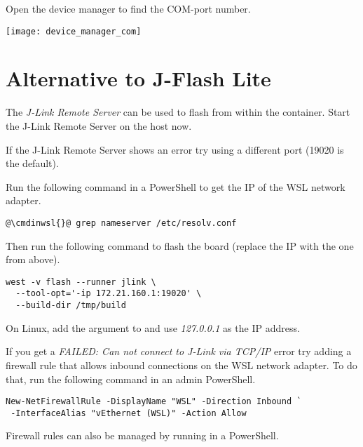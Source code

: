 \begin{infobox}
  Open the device manager to find the COM-port number.
  \begin{center}
    \texttt{[image: device\_manager\_com]}
  \end{center}
\end{infobox}

\newpage

\appendix

\section{Alternative to J-Flash Lite}\label{jlinkremote}

The \emph{J-Link Remote Server} can be used to flash from within the container.
Start the J-Link Remote Server on the host now.

\begin{infobox}
  If the J-Link Remote Server shows an error try using a different port (19020
  is the default).
\end{infobox}

Run the following command in a PowerShell to get the IP of the WSL network
adapter.

\begin{lstlisting}
@\cmdinwsl{}@ grep nameserver /etc/resolv.conf
\end{lstlisting}

Then run the following command to flash the board (replace the IP with the one
from above).

\begin{lstlisting}
west -v flash --runner jlink \
  --tool-opt='-ip 172.21.160.1:19020' \
  --build-dir /tmp/build
\end{lstlisting}

\begin{infobox}
  On Linux, add the  argument to 
  and use \emph{127.0.0.1} as the IP address.
\end{infobox}

\begin{infobox}
  If you get a \emph{FAILED: Can not connect to J-Link via TCP/IP} error try
  adding a firewall rule that allows inbound connections on the WSL network
  adapter. To do that, run the following command in an admin PowerShell.

  \begin{lstlisting}
New-NetFirewallRule -DisplayName "WSL" -Direction Inbound `
 -InterfaceAlias "vEthernet (WSL)" -Action Allow
\end{lstlisting}

  Firewall rules can also be managed by running  in a PowerShell.
\end{infobox}

